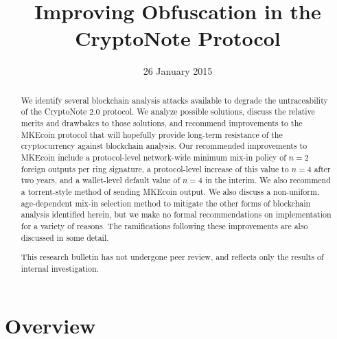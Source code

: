\documentclass[12pt,english]{mrl}
\theoremstyle{definition}
\numberwithin{equation}{section}
\numberwithin{figure}{section}
\numberwithin{equation}{section}
\numberwithin{equation}{section}
\numberwithin{figure}{section}
\begin{document}
\begin{frontmatter}

\begin{fmbox}
\hfill\setlength{\fboxrule}{0px}\setlength{\fboxsep}{5px}
\title{Improving Obfuscation in the CryptoNote Protocol}
\date{26 January 2015}
\author[
   addressref={mrl},
   email={lab@getmonero.org}
]{ }
\author[
   addressref={mrl},
   email={lab@getmonero.org}
]{ }
\author[
   addressref={mrl},
   email={lab@getmonero.org}
]{}


\address[id=mrl]{
}
\end{fmbox}


\begin{abstractbox}
\begin{abstract}
We identify several blockchain analysis attacks available to degrade the untraceability of the CryptoNote 2.0 protocol. We analyze possible solutions, discuss the relative merits and drawbakcs to those solutions, and recommend improvements to the MKEcoin protocol that will hopefully provide long-term resistance of the cryptocurrency against blockchain analysis. Our recommended improvements to MKEcoin include a protocol-level network-wide minimum mix-in policy of $n=2$ foreign outputs per ring signature, a protocol-level increase of this value to $n=4$ after two years, and a wallet-level default value of $n=4$ in the interim. We also recommend a torrent-style method of sending MKEcoin output. We also discuss a non-uniform, age-dependent mix-in selection method to mitigate the other forms of blockchain analysis identified herein, but we make no formal recommendations on implementation for a variety of reasons.  The ramifications following these improvements are also discussed in some detail.

This research bulletin has not undergone peer review, and reflects only the results of internal investigation.
\end{abstract}
\end{abstractbox}

\end{frontmatter}


\section{Overview}\label{overview}
\end{document}
